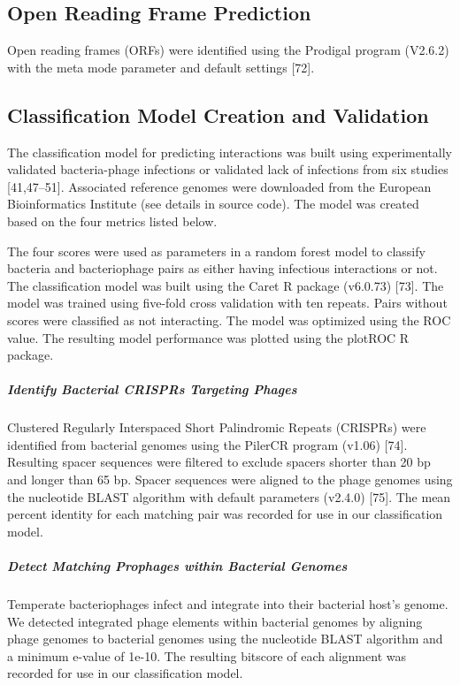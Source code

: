 \documentclass[12pt,]{article}
\let\oldsubparagraph\subparagraph
\renewcommand{\subparagraph}[1]{\oldsubparagraph{#1}\mbox{}}
\begin{document}
\subsection{Open Reading Frame
Prediction}\label{open-reading-frame-prediction}

Open reading frames (ORFs) were identified using the Prodigal program
(V2.6.2) with the meta mode parameter and default settings {[}72{]}.

\subsection{Classification Model Creation and
Validation}\label{classification-model-creation-and-validation}

The classification model for predicting interactions was built using
experimentally validated bacteria-phage infections or validated lack of
infections from six studies {[}41,47--51{]}. Associated reference
genomes were downloaded from the European Bioinformatics Institute (see
details in source code). The model was created based on the four metrics
listed below.

The four scores were used as parameters in a random forest model to
classify bacteria and bacteriophage pairs as either having infectious
interactions or not. The classification model was built using the Caret
R package (v6.0.73) {[}73{]}. The model was trained using five-fold
cross validation with ten repeats. Pairs without scores were classified
as not interacting. The model was optimized using the ROC value. The
resulting model performance was plotted using the plotROC R package.

\subparagraph{Identify Bacterial CRISPRs Targeting
Phages}\label{identify-bacterial-crisprs-targeting-phages}

Clustered Regularly Interspaced Short Palindromic Repeats (CRISPRs) were
identified from bacterial genomes using the PilerCR program (v1.06)
{[}74{]}. Resulting spacer sequences were filtered to exclude spacers
shorter than 20 bp and longer than 65 bp. Spacer sequences were aligned
to the phage genomes using the nucleotide BLAST algorithm with default
parameters (v2.4.0) {[}75{]}. The mean percent identity for each
matching pair was recorded for use in our classification model.

\subparagraph{Detect Matching Prophages within Bacterial
Genomes}\label{detect-matching-prophages-within-bacterial-genomes}

Temperate bacteriophages infect and integrate into their bacterial
host's genome. We detected integrated phage elements within bacterial
genomes by aligning phage genomes to bacterial genomes using the
nucleotide BLAST algorithm and a minimum e-value of 1e-10. The resulting
bitscore of each alignment was recorded for use in our classification
model.
\end{document}
